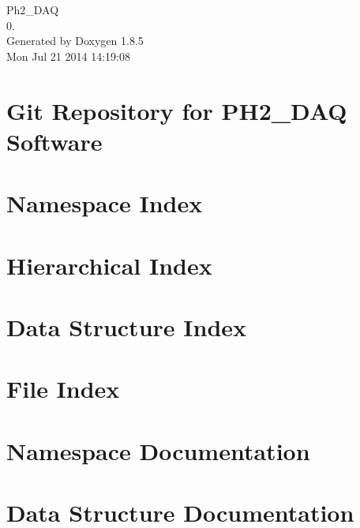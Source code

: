 \documentclass[twoside]{book}
\newcommand{\clearemptydoublepage}{%
  \newpage{\pagestyle{empty}\cleardoublepage}%
}
\begin{document}
\hypersetup{pageanchor=false}
\begin{titlepage}
\vspace*{7cm}
\begin{center}%
{\Large Ph2\-\_\-\-D\-A\-Q \\[1ex]\large 0. }\\
\vspace*{1cm}
{\large Generated by Doxygen 1.8.5}\\
\vspace*{0.5cm}
{\small Mon Jul 21 2014 14:19:08}\\
\end{center}
\end{titlepage}
\clearemptydoublepage
\tableofcontents
\clearemptydoublepage
{}
\hypersetup{pageanchor=true}

\chapter{Git Repository for P\-H2\-\_\-\-D\-A\-Q Software}
\label{md__r_e_a_d_m_e}
\hypertarget{md__r_e_a_d_m_e}{}

\chapter{Namespace Index}

\chapter{Hierarchical Index}

\chapter{Data Structure Index}

\chapter{File Index}

\chapter{Namespace Documentation}


\chapter{Data Structure Documentation}














\end{document}
